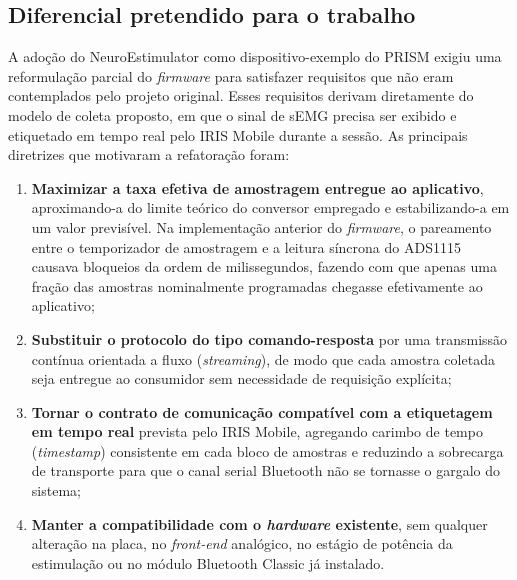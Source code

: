 %

\subsection{Diferencial pretendido para o trabalho}\label{subsec:NERequisitos}

A adoção do NeuroEstimulator como dispositivo-exemplo do PRISM exigiu uma reformulação parcial do \textit{firmware} para satisfazer requisitos que não eram contemplados pelo projeto original. Esses requisitos derivam diretamente do modelo de coleta proposto, em que o sinal de sEMG precisa ser exibido e etiquetado em tempo real pelo IRIS Mobile durante a sessão. As principais diretrizes que motivaram a refatoração foram:

\begin{enumerate}
    \item \textbf{Maximizar a taxa efetiva de amostragem entregue ao aplicativo}, aproximando-a do limite teórico do conversor empregado e estabilizando-a em um valor previsível. Na implementação anterior do \textit{firmware}, o pareamento entre o temporizador de amostragem e a leitura síncrona do ADS1115 causava bloqueios da ordem de milissegundos, fazendo com que apenas uma fração das amostras nominalmente programadas chegasse efetivamente ao aplicativo;
    \item \textbf{Substituir o protocolo do tipo comando-resposta} por uma transmissão contínua orientada a fluxo (\textit{streaming}), de modo que cada amostra coletada seja entregue ao consumidor sem necessidade de requisição explícita;
    \item \textbf{Tornar o contrato de comunicação compatível com a etiquetagem em tempo real} prevista pelo IRIS Mobile, agregando carimbo de tempo (\textit{timestamp}) consistente em cada bloco de amostras e reduzindo a sobrecarga de transporte para que o canal serial Bluetooth não se tornasse o gargalo do sistema;
    \item \textbf{Manter a compatibilidade com o \textit{hardware} existente}, sem qualquer alteração na placa, no \textit{front-end} analógico, no estágio de potência da estimulação ou no módulo Bluetooth Classic já instalado.
\end{enumerate}

